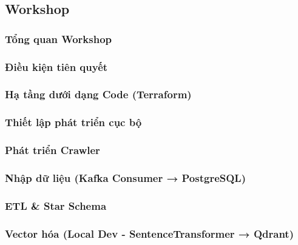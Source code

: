 \newpage

\subsection{Workshop}

\subsubsection{Tổng quan Workshop}


\subsubsection{Điều kiện tiên quyết}


\subsubsection{Hạ tầng dưới dạng Code (Terraform)}


\subsubsection{Thiết lập phát triển cục bộ}


\subsubsection{Phát triển Crawler}


\subsubsection{Nhập dữ liệu (Kafka Consumer → PostgreSQL)}


\subsubsection{ETL \& Star Schema}


\subsubsection{Vector hóa (Local Dev - SentenceTransformer → Qdrant)}



